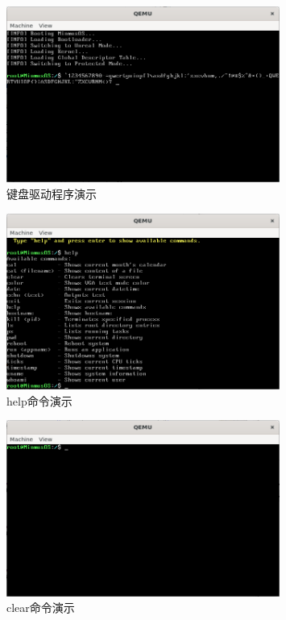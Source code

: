 \begin{figure}[htbp]
    \centering
    \includegraphics[width=0.8\textwidth]{figures/KeyboardDriverPresentation.png}
    \caption{键盘驱动程序演示}
\end{figure}

\begin{figure}[htbp]
    \centering
    \includegraphics[width=0.8\textwidth]{figures/HelpCommandPresentation.png}
    \caption{help命令演示}
\end{figure}

\begin{figure}[htbp]
    \centering
    \includegraphics[width=0.8\textwidth]{figures/ClearCommandPresentation.png}
    \caption{clear命令演示}
\end{figure}

